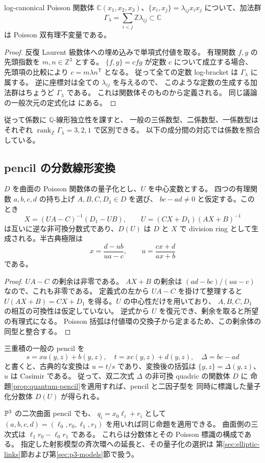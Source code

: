 \begin{proposition}\label{prop:log-coefficient-invariant}
log-canonical Poisson 関数体
$\mathbb C(x_1,x_2,x_3)$、$\{x_i,x_j\}=\lambda_{ij}x_ix_j$
について、加法群
\[
 \Gamma_\lambda=\sum_{i<j}\mathbb Z\lambda_{ij}\subset\mathbb C
\]
は Poisson 双有理不変量である。
\end{proposition}
\begin{proof}
反復 Laurent 級数体への埋め込みで単項式付値を取る。
有理関数 $f,g$ の先頭指数を $m,n\in\mathbb Z^3$ とする。
$\{f,g\}=c fg$ が定数 $c$ について成立する場合、
先頭項の比較により $c=m\lambda n^{\mathsf T}$ となる。
従って全ての定数 log-bracket は $\Gamma_\lambda$ に属する。
逆に座標対は全ての $\lambda_{ij}$ を与えるので、
このような定数の生成する加法群はちょうど $\Gamma_\lambda$ である。
これは関数体そのものから定義される。
同じ議論の一般次元の定式化は
\cite[命題5.2(b)、定理5.5]{GoodearlLaunois} にある。
\end{proof}

従って係数に $\mathbb Q$-線形独立性を課すと、
一般の三係数型、二係数型、一係数型はそれぞれ
$\operatorname{rank}_{\mathbb Z}\Gamma_\lambda=3,2,1$ で区別できる。
以下の成分間の対応では係数を照合している。

\subsection{pencil の分数線形変換}

\begin{proposition}\label{prop:quantum-pencil}
$D$ を曲面の Poisson 関数体の量子化とし、$U$ を中心変数とする。
四つの有理関数 $a,b,c,d$ の持ち上げ $A,B,C,D_1\in D$ を選び、
$bc-ad\ne0$ と仮定する。このとき
\[
 X=(UA-C)^{-1}(D_1-UB),\qquad
 U=(CX+D_1)(AX+B)^{-1}
\]
は互いに逆な非可換分数式であり、$D(U)$ は $D$ と $X$ で division ring
として生成される。半古典極限は
\[
 x=\frac{d-ub}{ua-c},\qquad u=\frac{cx+d}{ax+b}
\]
である。
\end{proposition}
\begin{proof}
$UA-C$ の剰余は非零である。
$AX+B$ の剰余は $(ad-bc)/(ua-c)$ なので、これも非零である。
定義式の左から $UA-C$ を掛けて整理すると
$U(AX+B)=CX+D_1$ を得る。$U$ の中心性だけを用いており、
$A,B,C,D_1$ の相互の可換性は仮定していない。
逆式から $U$ を復元でき、剰余を取ると所望の有理式になる。
Poisson 括弧は付値環の交換子から定まるため、この剰余体の同型と整合する。
\end{proof}

三重積の一般の pencil を
\[
 s=xa(y,z)+b(y,z),\quad t=xc(y,z)+d(y,z),\quad
 \Delta=bc-ad
\]
と書くと、古典的な変換は $u=t/s$ であり、変換後の括弧は
$\{y,z\}=\Delta(y,z)$、$u$ は Casimir である。
従って、双二次式 $\Delta$ の非可換 quadric の関数体 $D$ に
命題\ref{prop:quantum-pencil}を適用すれば、pencil と二因子型を
同時に標識した量子化分数体 $D(U)$ が得られる。

$\mathbb P^3$ の二次曲面 pencil でも、
$q_i=x_0\ell_i+r_i$ として
$(a,b,c,d)=(\ell_0,r_0,\ell_1,r_1)$ を用いれば同じ命題を適用できる。
曲面側の三次式は $\ell_1r_0-\ell_0r_1$ である。
これらは分数体とその Poisson 標識の構成である。
指定した射影模型の斉次環への延長と、その量子化の選択は
第\ref{sec:elliptic-links}節および第\ref{sec:p3-models}節で扱う。

